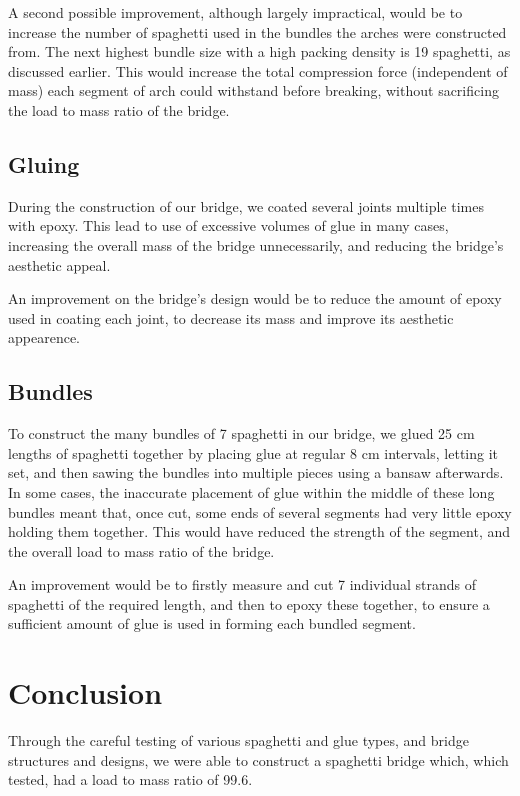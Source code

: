 \documentclass[a4paper,11pt]{article}
\begin{document}
A second possible improvement, although largely impractical, would be to
increase the number of spaghetti used in the bundles the arches were constructed
from.
The next highest bundle size with a high packing density is 19 spaghetti, as
discussed earlier.
This would increase the total compression force (independent of mass) each
segment of arch could withstand before breaking, without sacrificing the load to
mass ratio of the bridge.


\subsection{Gluing}

During the construction of our bridge, we coated several joints multiple times
with epoxy.
This lead to use of excessive volumes of glue in many cases, increasing the
overall mass of the bridge unnecessarily, and reducing the bridge's aesthetic
appeal.

An improvement on the bridge's design would be to reduce the amount of epoxy
used in coating each joint, to decrease its mass and improve its aesthetic
appearence.


\subsection{Bundles}

To construct the many bundles of 7 spaghetti in our bridge, we glued 25 cm
lengths of spaghetti together by placing glue at regular 8 cm intervals, letting
it set, and then sawing the bundles into multiple pieces using a bansaw
afterwards.
In some cases, the inaccurate placement of glue within the middle of these long
bundles meant that, once cut, some ends of several segments had very little
epoxy holding them together.
This would have reduced the strength of the segment, and the overall load to
mass ratio of the bridge.

An improvement would be to firstly measure and cut 7 individual strands of
spaghetti of the required length, and then to epoxy these together, to ensure a
sufficient amount of glue is used in forming each bundled segment.



\section{Conclusion}

Through the careful testing of various spaghetti and glue types, and bridge
structures and designs, we were able to construct a spaghetti bridge which,
which tested, had a load to mass ratio of 99.6.
\end{document}

